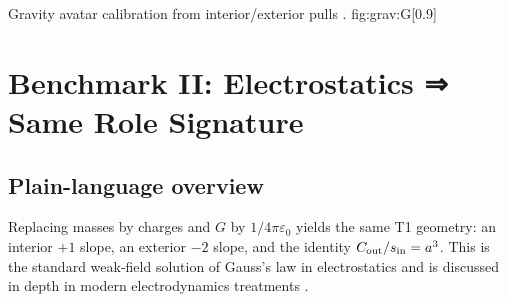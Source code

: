 \documentclass[12pt,a4paper,oneside]{scrreprt}
\begin{document}
       {Gravity avatar calibration from interior/exterior pulls
       \cite{PoissonWill2014,MisnerThorneWheeler1973}.}
       {fig:grav:G}[0.9]


\chapter{Benchmark II: Electrostatics ⇒ Same Role Signature}
\section*{Plain-language overview}
Replacing masses by charges and $G$ by $1/4\pi\varepsilon_0$ yields the same T1 geometry:
an interior $+1$ slope, an exterior $-2$ slope, and the identity
$C_{\rm out}/s_{\rm in}=a^3$.
This is the standard weak-field solution of Gauss’s law in electrostatics
\cite{Jackson1999,Griffiths2017} and is discussed in depth in
modern electrodynamics treatments \cite{Zangwill2012,Purcell2013}.
\end{document}
